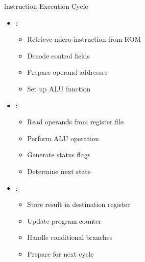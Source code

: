 \begin{frame}{Instruction Execution Cycle}
\begin{itemize}
\item {}:
\begin{itemize}
\item Retrieve micro-instruction from ROM
\item Decode control fields
\item Prepare operand addresses
\item Set up ALU function
\end{itemize}
\vspace{0.5cm}
\item {}:
\begin{itemize}
\item Read operands from register file
\item Perform ALU operation
\item Generate status flags
\item Determine next state
\end{itemize}
\vspace{0.3cm}
\item {}:
\begin{itemize}
\item Store result in destination register
\item Update program counter
\item Handle conditional branches
\item Prepare for next cycle
\end{itemize}
\end{itemize}
\end{frame}

